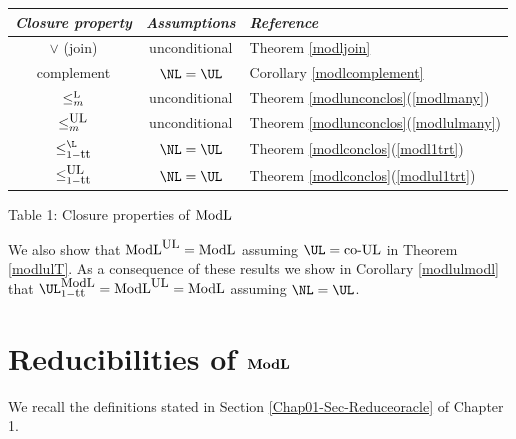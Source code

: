 \documentclass{amsbook}
\theoremstyle{definition}
\theoremstyle{remark}
\numberwithin{section}{chapter}
\numberwithin{equation}{chapter}
\newcommand{\Lredn}{\leq^{\small{\rm L}}_m}
\newcommand{\coUL}{\mbox{\rm co-UL}}
\newcommand{\ULredn}{\mbox{\small{\rm UL}}}
\newcommand{\ModL}{\mbox{\rm ModL}}
\newcommand{\boldModL}{\mbox{\rm \bf ModL}}
\newcommand{\ModLredn}{\mbox{\small{\rm ModL}}}
\newcommand{\trt}{\mbox{\small{\rm tt}}}
\begin{document}
\begin{center}
\begin{tabular}{||c|c|l||}\hline\hline
\emph{Closure property} & \emph{Assumptions} & \emph{Reference} \\ \hline\hline
$\vee$ (join) & unconditional & Theorem \ref{modljoin} \\ \hline
complement & $\NL =\UL$ & Corollary \ref{modlcomplement} \\ \hline
${\Lredn}$ & unconditional & Theorem \ref{modlunconclos}(\ref{modlmany}) \\ \hline
$\leq^{\ULredn}_m$ & unconditional & Theorem \ref{modlunconclos}(\ref{modlulmany}) \\ \hline
$\leq_{1-\trt}^{\L}$ & $\NL =\UL$ & Theorem \ref{modlconclos}(\ref{modl1trt}) \\ \hline
$\leq^{\ULredn}_{1-\trt}$ & $\NL =\UL$ & Theorem \ref{modlconclos}(\ref{modlul1trt}) \\ \hline\hline
\end{tabular}
\end{center}
\begin{center}Table 1: Closure properties of $\ModL$\end{center}
We also show that $\ModL^{\ULredn}=\ModL$ assuming $\UL =\coUL$ in Theorem \ref{modlulT}. As a consequence of these results we show in Corollary \ref{modlulmodl} that $\UL_{1-\trt}^{\ModLredn}=\ModL^{\ULredn}=\ModL$ assuming $\NL =\UL$.

\section{Reducibilities of $\boldModL$}\label{modl-closure-properties}
We recall the definitions stated in Section \ref{Chap01-Sec-Reduceoracle} of Chapter 1.
\end{document}
